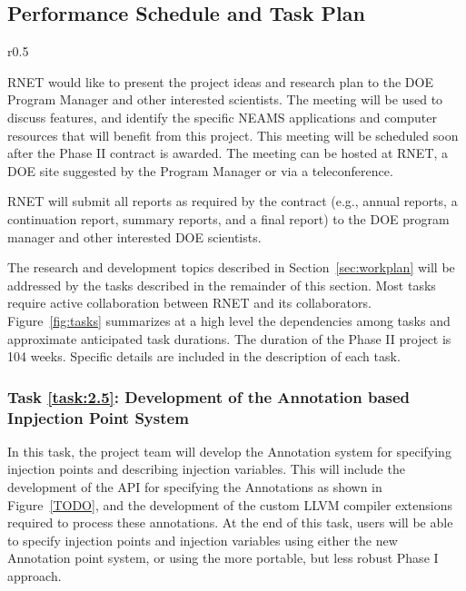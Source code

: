 \subsection{Performance Schedule and Task Plan}
\label{sec:taskplan}

\begin{wrapfigure}{r}{0.5\linewidth}%
\begin{center}
\leavevmode
\end{center}
\caption{Overview of task dependencies and timeline.}
\label{fig:tasks}
\end{wrapfigure}

RNET would like to present the project ideas and research plan to the
DOE Program Manager and other interested scientists. The meeting will
be used to discuss features, and identify the specific NEAMS applications and computer
resources that will benefit from this project.  This meeting will be
scheduled soon after the Phase II contract is awarded. The meeting can
be hosted at RNET, a DOE site suggested by the Program Manager or via
a teleconference.

RNET will submit all reports as required by the contract (e.g., annual reports, 
a continuation report, summary reports, and a final report) to the DOE program 
manager and other interested DOE scientists.

The research and development topics described in Section~\ref{sec:workplan} 
will be addressed by the tasks described in the remainder of this section. Most 
tasks require active collaboration between RNET and its collaborators. 
Figure~\ref{fig:tasks} summarizes at a high level the dependencies among tasks  and
approximate anticipated task durations. The duration of the Phase II 
project is 104 weeks. Specific details are included in the description of each 
task.


\setcounter{taskCount}{0}

\label{task:2.5}
\subsubsection{Task \ref{task:2.5}: Development of the Annotation based Inpjection Point System  }

In this task, the project team will develop the Annotation system for specifying injection points and describing injection variables. This will include the development of
the API for specifying the Annotations as shown in Figure~\ref{TODO}, and the development of the custom LLVM compiler extensions required to process these annotations. At the end of this task, users will be able to specify injection points and injection variables using either the new Annotation point system, or using the more portable, but less robust Phase I approach. 

